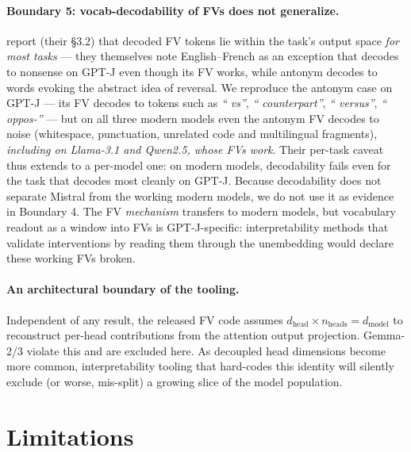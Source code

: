 \documentclass[11pt]{article}
\begin{document}
\paragraph{Boundary 5: vocab-decodability of FVs does not generalize.}
\citet{todd2024function} report (their \S3.2) that decoded FV tokens lie
within the task's output space \emph{for most tasks} --- they themselves
note English--French as an exception that decodes to nonsense on GPT-J
even though its FV works, while antonym decodes to words evoking the
abstract idea of reversal. We reproduce the antonym case on GPT-J --- its
FV decodes to tokens such as \emph{`` vs''}, \emph{`` counterpart''},
\emph{`` versus''}, \emph{`` oppos-''} --- but on all three modern models
even the antonym FV decodes to noise (whitespace, punctuation, unrelated
code and multilingual fragments), \emph{including on Llama-3.1 and
Qwen2.5, whose FVs work}. Their per-task caveat thus extends to a
per-model one: on modern models, decodability fails even for the task
that decodes most cleanly on GPT-J. Because decodability does not
separate Mistral from the working modern models, we do not use it as
evidence in Boundary 4. The FV \emph{mechanism} transfers to modern
models, but vocabulary readout as a window into FVs is GPT-J-specific:
interpretability methods that validate interventions by reading them
through the unembedding would declare these working FVs broken.

\paragraph{An architectural boundary of the tooling.} Independent of any
result, the released FV code assumes
$d_{\text{head}} \times n_{\text{heads}} = d_{\text{model}}$ to reconstruct
per-head contributions from the attention output projection. Gemma-2/3
violate this and are excluded here. As decoupled head dimensions become
more common, interpretability tooling that hard-codes this identity will
silently exclude (or worse, mis-split) a growing slice of the model
population.

\section{Limitations}
\label{sec:limitations}
\end{document}
